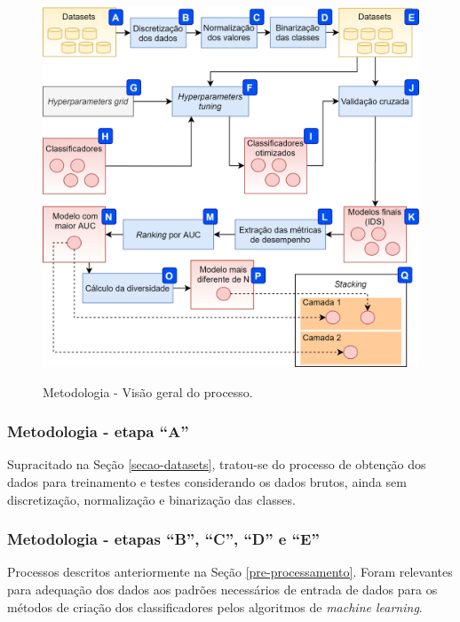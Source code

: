 \begin{figure}[H]
\centering
\caption{Metodologia - Visão geral do processo.}
\includegraphics[width=\textwidth,keepaspectratio]{figs/metodologiafinal.png}
\newline {}\label{fig:metodologia}
\end{figure}


\subsubsection*{Metodologia - etapa ``A''}

Supracitado na Seção \ref{secao-datasets}, tratou-se do processo de obtenção dos dados para treinamento e testes considerando os dados brutos, ainda sem discretização, normalização e binarização das classes.

\subsubsection*{Metodologia - etapas ``B'', ``C'', ``D'' e ``E''}

Processos descritos anteriormente na Seção \ref{pre-processamento}. Foram relevantes para adequação dos dados aos padrões necessários de entrada de dados para os métodos de criação dos classificadores pelos algoritmos de \textit{machine learning}. 

